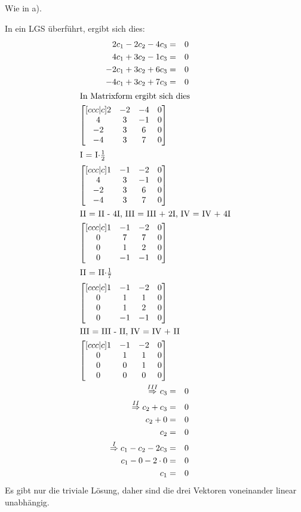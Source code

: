 \documentclass[10pt,a4paper,oneside,ngerman,numbers=noenddot]{scrartcl}
\begin{document}
\subsection{} %
Wie in a).

In ein LGS überführt, ergibt sich dies:\\
\begin{alignat*}{2}
2c_{1} - 2c_{2} - 4c_{3} &=& 0 \\
4c_{1} + 3c_{2} - 1c_{3} &=& 0 \\
-2c_{1} + 3c_{2} + 6c_{3} &=& 0 \\
-4c_{1} + 3c_{2} + 7c_{3} &=& 0 \\
\intertext{In Matrixform ergibt sich dies}
\begin{bmatrix}[ccc|c]
2 & -2 & -4 & 0 \\
4 & 3 & -1 & 0 \\
-2 & 3 & 6 & 0 \\
-4 & 3 & 7 & 0
\end{bmatrix} \\
\intertext{I = I$ \cdot \frac{1}{2}$}
\begin{bmatrix}[ccc|c]
1 & -1 & -2 & 0 \\
4 & 3 & -1 & 0 \\
-2 & 3 & 6 & 0 \\
-4 & 3 & 7 & 0
\end{bmatrix} \\
\intertext{II = II - 4I, III = III + 2I, IV = IV + 4I}
\begin{bmatrix}[ccc|c]
1 & -1 & -2 & 0 \\
0 & 7 & 7 & 0 \\
0 & 1 & 2 & 0 \\
0 & -1 & -1 & 0
\end{bmatrix}  \\
\intertext{II = II$ \cdot \frac{1}{7}$}
\begin{bmatrix}[ccc|c]
1 & -1 & -2 & 0 \\
0 & 1 & 1 & 0 \\
0 & 1 & 2 & 0 \\
0 & -1 & -1 & 0
\end{bmatrix} \\
\intertext{III = III - II, IV = IV + II}
\begin{bmatrix}[ccc|c]
1 & -1 & -2 & 0 \\
0 & 1 & 1 & 0 \\
0 & 0 & 1 & 0 \\
0 & 0 & 0 & 0
\end{bmatrix} \\
\overset{III}{\Rightarrow} c_{3} &=& 0 \\
\overset{II}{\Rightarrow} c_{2} + c_{3} &=& 0 \\
c_{2} + 0 &=& 0 \\
c_{2} &=& 0 \\
\overset{I}{\Rightarrow} c_{1} - c_{2} - 2c_{3} &=& 0 \\
c_{1} - 0 - 2 \cdot 0 &=& 0 \\
c_{1} &=& 0
\end{alignat*}
Es gibt nur die triviale Lösung, daher sind die drei Vektoren voneinander linear unabhängig.
\end{document}

